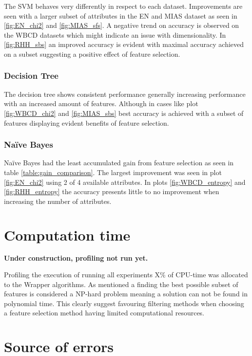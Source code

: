 The SVM behaves very differently in respect to each dataset. Improvements are seen with a larger subset of attributes in the EN and MIAS dataset as seen in \ref{fig:EN_chi2} and \ref{fig:MIAS_sfs}. A negative trend on accuracy is observed on the WBCD datasets which might indicate an issue with dimensionality. In \ref{fig:RHH_sbs} an improved accuracy is evident with maximal accuracy achieved on a subset suggesting a positive effect of feature selection.

\subsubsection{Decision Tree}

The decision tree shows consistent performance generally increasing performance with an increased amount of features. Although in cases like plot \ref{fig:WBCD_chi2} and \ref{fig:MIAS_sbs} best accuracy is achieved with a subset of features displaying evident benefits of feature selection.

\subsubsection{Naïve Bayes}

Naïve Bayes had the least accumulated gain from feature selection as seen in table \ref{table:gain_comparison}. The largest improvement was seen in plot \ref{fig:EN_chi2} using 2 of 4 available attributes. In plots \ref{fig:WBCD_entropy} and \ref{fig:RHH_entropy} the accuracy presents little to no improvement when increasing the number of attributes.






\newpage
\section{Computation time}

\textbf{Under construction, profiling not run yet.}

Profiling the execution of running all experiments X\% of CPU-time was allocated to the Wrapper algorithms. As mentioned a finding the best possible subset of features is considered a NP-hard problem meaning a solution can not be found in polynomial time. This clearly suggest favouring filtering methods when choosing a feature selection method having limited computational resources.

\section{Source of errors}
\label{sec:source_of_errors}

